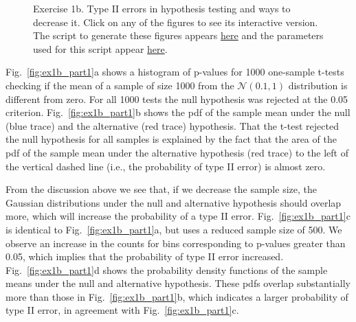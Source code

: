 \documentclass[12pt]{article}
\begin{document}
\begin{enumerate}[(a)]
\begin{figure}[H]
\begin{center}
                \caption{Exercise 1b. Type II errors in hypothesis testing and
                ways to decrease it. Click on any of the figures to see its
                interactive version.  The script to generate these figures
                appears
                \href{https://github.com/joacorapela/neuroinformatics23/blob/master/worksheets/ws1/mySolution/code/scripts/doPlotTwoGaussians.py}{here}
                and the parameters used for this script appear
                \href{https://github.com/joacorapela/neuroinformatics23/blob/master/worksheets/ws1/mySolution/code/scripts/doPlotTwoGaussians.py}{here}.}

                \label{fig:typeIIerror}
            \end{center}
        \end{figure}

        Fig.~\ref{fig:ex1b_part1}a shows a histogram of p-values for 1000
        one-sample t-tests checking if the mean of a sample of size 1000 from
        the $\mathcal{N}(0.1, 1)$ distribution is different from zero.
        For all 1000 tests the null hypothesis was rejected at the 0.05
        criterion.
        Fig.~\ref{fig:ex1b_part1}b shows the pdf of the sample mean under
        the null (blue trace) and the alternative (red trace) hypothesis.  That
        the t-test rejected the null hypothesis for all samples is
        explained by the fact that the area of the pdf of the sample mean under
        the alternative hypothesis (red trace) to the left of the vertical
        dashed line (i.e., the probability of type II error) is almost zero.

        From the discussion above we see that, if we decrease the sample size,
        the Gaussian distributions under the null and alternative hypothesis
        should overlap more, which will increase the probability of a type II
        error. Fig.~\ref{fig:ex1b_part1}c is identical to
        Fig.~\ref{fig:ex1b_part1}a, but uses a reduced sample size of 500.
        We observe an increase in  the counts for bins corresponding to p-values
        greater than 0.05, which implies that the probability of type II error
        increased.  Fig.~\ref{fig:ex1b_part1}d shows the probability
        density functions of the sample means under the null and alternative
        hypothesis. These pdfs overlap substantially more than those in
        Fig.~\ref{fig:ex1b_part1}b, which indicates a larger probability of
        type II error, in agreement with Fig.~\ref{fig:ex1b_part1}c.


\end{enumerate}
\end{document}
